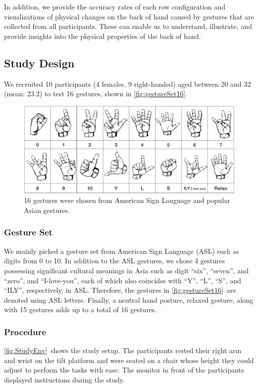 \documentclass{sigchi}
\begin{document}
In addition, we provide the accuracy rates of each row configuration and visualizations of physical changes on the back of hand caused by gestures that are collected from all participants. These can enable us to understand, illustrate, and provide insights into the physical properties of the back of hand. %

\subsection{Study Design}
We recruited 10 participants (4 females, 9 right-handed) aged between 20 and 32 (mean: 23.2) to test 16 gestures, shown in \autoref{fig:gestureSet16}.

\begin{figure}[b]
  \begin{center}
  \includegraphics[width=1\columnwidth]{figures/gestureSet_16_v3.pdf}
  \caption{16 gestures were chosen from American Sign Language and popular Asian gestures.}
  \label{fig:gestureSet16}
  \end{center}
\end{figure}

\subsubsection{Gesture Set}
We mainly picked a gesture set from American Sign Language (ASL) such as digits from 0 to 10. In addition to the ASL gestures, we chose 4 gestures possessing significant cultural meanings in Asia such as digit ``six'', ``seven'', and ``zero'', and ``I-love-you'', each of which also coincides with ``Y'', ``L'', ``S'', and ``ILY'', respectively, in ASL. Therefore, the gestures in \autoref{fig:gestureSet16}\ are denoted using ASL letters. Finally, a neutral hand posture, relaxed gesture, along with 15 gestures adds up to a total of 16 gestures.

\subsubsection{Procedure}
\autoref{fig:StudyEnv}\ shows the study setup. The participants rested their right arm and wrist on the tilt platform and were seated on a chair whose height they could adjust to perform the tasks with ease. The monitor in front of the participants displayed instructions during the study.
\end{document}
